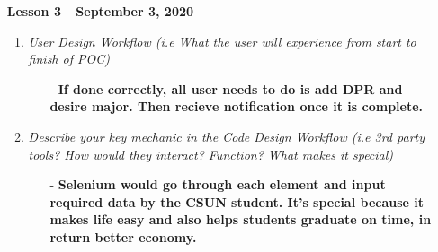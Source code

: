 \begin{enumerate}
\begin{enumerate}
\begin{enumerate}
    \end{enumerate}
  \end{enumerate} 
  \item[\textbf{Lesson 3}] -\ \textbf{September 3, 2020}
  \begin{enumerate}
    \item \textsl{User Design Workflow (i.e What the user will experience from start to finish of POC)}
    \begin{enumerate}
      \item[-] \textbf{If done correctly, all user needs to do is add DPR and desire major. Then recieve notification once it is complete.}
    \end{enumerate}
    \item \textsl{Describe your key mechanic in the Code Design Workflow (i.e 3rd party tools? How would they interact? Function? What makes it special)}
    \begin{enumerate}
      \item[-] \textbf{Selenium would go through each element and input required data by the CSUN student. It's special because it makes life easy and also helps students graduate on time, in return better economy.}
    \end{enumerate}
  \end{enumerate}
\end{enumerate}

